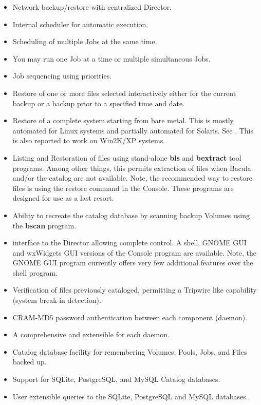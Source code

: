 \begin{itemize}
\item Network backup/restore with centralized Director.  
\item Internal scheduler for automatic 
    execution.  
\item Scheduling of multiple Jobs at the same time.  
\item You may run one Job at a time or multiple simultaneous Jobs.  
\item Job sequencing using priorities.  
\item Restore of one or more files selected interactively either for  the
   current backup or a backup prior to a specified time and date.  
\item Restore of a complete system starting from bare  metal. This is mostly
   automated for Linux systems and  partially automated for Solaris. See 
   . This is also
   reported to work on Win2K/XP systems.  
\item Listing and Restoration of files using stand-alone {\bf bls} and  {\bf
   bextract} tool programs. Among other things, this permits  extraction of files
   when Bacula and/or the catalog are not  available. Note, the recommended way
   to restore files is using  the restore command in the Console. These programs
   are designed  for use as a last resort. 
\item Ability to recreate the catalog database by scanning backup Volumes 
   using the {\bf bscan} program.  
\item 
    interface to the Director  allowing complete
   control. A shell, GNOME GUI and wxWidgets GUI versions of  the Console program
   are available. Note, the GNOME GUI program currently  offers very few
   additional features over the shell program. 
\item Verification of files previously cataloged, permitting a Tripwire like 
   capability (system break-in detection).  
\item CRAM-MD5 password authentication between each component (daemon).  
\item A comprehensive and extensible 
    for each daemon.  
\item Catalog database facility for remembering Volumes, Pools, Jobs,  and
   Files backed up.  
\item Support for SQLite, PostgreSQL, and MySQL Catalog databases.  
\item User extensible queries to the SQLite, PostgreSQL and MySQL databases.  

\end{itemize}
